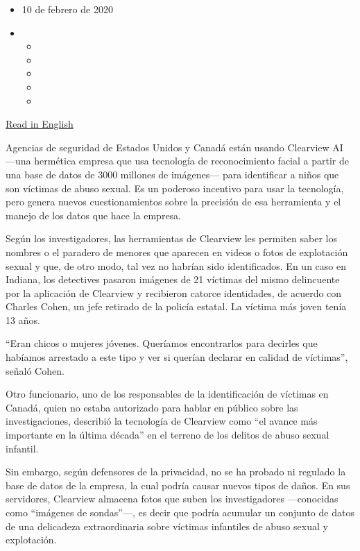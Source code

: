\begin{itemize}
\item
  10 de febrero de 2020
\item
  \begin{itemize}
  \item
  \item
  \item
  \item
  \item
  \end{itemize}
\end{itemize}

\href{https://www.nytimes3xbfgragh.onion/2020/02/07/business/clearview-facial-recognition-child-sexual-abuse.html}{Read
in English}

Agencias de seguridad de Estados Unidos y Canadá están usando Clearview
AI ---una hermética empresa que usa tecnología de reconocimiento facial
a partir de una base de datos de 3000 millones de imágenes--- para
identificar a niños que son víctimas de abuso sexual. Es un poderoso
incentivo para usar la tecnología, pero genera nuevos cuestionamientos
sobre la precisión de esa herramienta y el manejo de los datos que hace
la empresa.

Según los investigadores, las herramientas de Clearview les permiten
saber los nombres o el paradero de menores que aparecen en videos o
fotos de explotación sexual y que, de otro modo, tal vez no habrían sido
identificados. En un caso en Indiana, los detectives pasaron imágenes de
21 víctimas del mismo delincuente por la aplicación de Clearview y
recibieron catorce identidades, de acuerdo con Charles Cohen, un jefe
retirado de la policía estatal. La víctima más joven tenía 13 años.

``Eran chicos o mujeres jóvenes. Queríamos encontrarlos para decirles
que habíamos arrestado a este tipo y ver si querían declarar en calidad
de víctimas'', señaló Cohen.

Otro funcionario, uno de los responsables de la identificación de
víctimas en Canadá, quien no estaba autorizado para hablar en público
sobre las investigaciones, describió la tecnología de Clearview como
``el avance más importante en la última década'' en el terreno de los
delitos de abuso sexual infantil.

Sin embargo, según defensores de la privacidad, no se ha probado ni
regulado la base de datos de la empresa, la cual podría causar nuevos
tipos de daños. En sus servidores, Clearview almacena fotos que suben
los investigadores ---conocidas como ``imágenes de sondas''---, es decir
que podría acumular un conjunto de datos de una delicadeza
extraordinaria sobre víctimas infantiles de abuso sexual y explotación.

